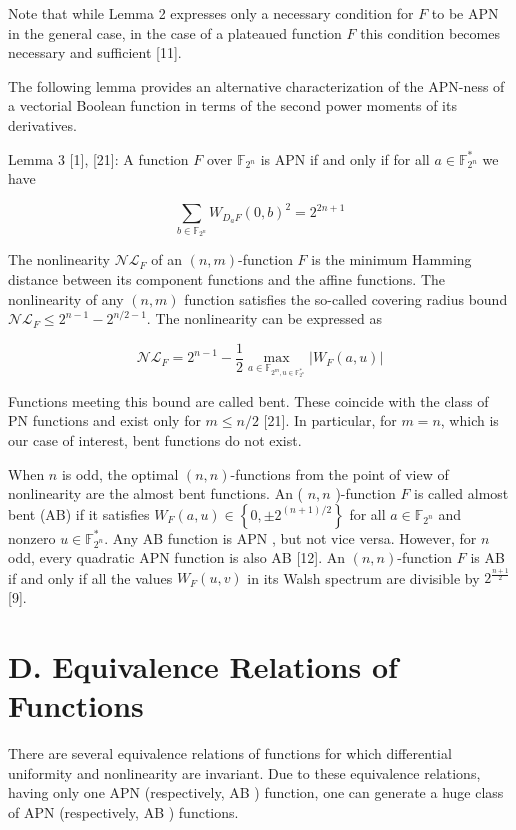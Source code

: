 \documentclass[10pt]{article}
\begin{document}
Note that while Lemma 2 expresses only a necessary condition for $F$ to be APN in the general case, in the case of a plateaued function $F$ this condition becomes necessary and sufficient [11].

The following lemma provides an alternative characterization of the APN-ness of a vectorial Boolean function in terms of the second power moments of its derivatives.

Lemma 3 [1], [21]: A function $F$ over $\mathbb{F}_{2^{n}}$ is APN if and only if for all $a \in \mathbb{F}_{2^{n}}^{*}$ we have

$$
\sum_{b \in \mathbb{F}_{2^{n}}} W_{D_{a} F}(0, b)^{2}=2^{2 n+1}
$$

The nonlinearity $\mathcal{N} \mathcal{L}_{F}$ of an $(n, m)$-function $F$ is the minimum Hamming distance between its component functions and the affine functions. The nonlinearity of any $(n, m)$ function satisfies the so-called covering radius bound $\mathcal{N} \mathcal{L}_{F} \leq 2^{n-1}-2^{n / 2-1}$. The nonlinearity can be expressed as

$$
\mathcal{N} \mathcal{L}_{F}=2^{n-1}-\frac{1}{2} \max _{a \in \mathbb{F}_{2^{m}, u \in \mathbb{F}_{2^{n}}^{*}}}\left|W_{F}(a, u)\right|
$$

Functions meeting this bound are called bent. These coincide with the class of PN functions and exist only for $m \leq n / 2$ [21]. In particular, for $m=n$, which is our case of interest, bent functions do not exist.

When $n$ is odd, the optimal $(n, n)$-functions from the point of view of nonlinearity are the almost bent functions. An ( $n, n$ )-function $F$ is called almost bent (AB) if it satisfies $W_{F}(a, u) \in\left\{0, \pm 2^{(n+1) / 2}\right\}$ for all $a \in \mathbb{F}_{2^{n}}$ and nonzero $u \in \mathbb{F}_{2^{n}}^{*}$. Any AB function is APN , but not vice versa. However, for $n$ odd, every quadratic APN function is also AB [12]. An $(n, n)$-function $F$ is AB if and only if all the values $W_{F}(u, v)$ in its Walsh spectrum are divisible by $2^{\frac{n+1}{2}}$ [9].

\section*{D. Equivalence Relations of Functions}
There are several equivalence relations of functions for which differential uniformity and nonlinearity are invariant. Due to these equivalence relations, having only one APN (respectively, AB ) function, one can generate a huge class of APN (respectively, AB ) functions.
\end{document}
